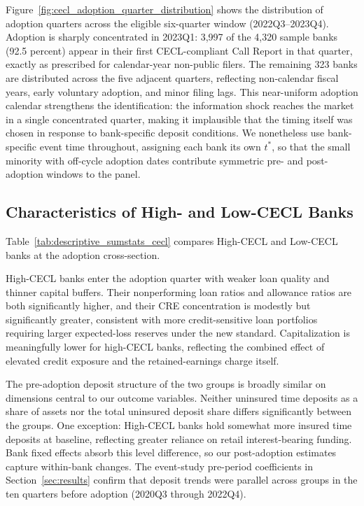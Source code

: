 Figure~\ref{fig:cecl_adoption_quarter_distribution} shows the distribution of
adoption quarters across the eligible six-quarter window (2022Q3--2023Q4).
Adoption is sharply concentrated in 2023Q1: 3,997 of the 4,320 sample banks
(92.5 percent) appear in their first CECL-compliant Call Report in that quarter,
exactly as prescribed for calendar-year non-public filers.  The remaining
323 banks are distributed across the five adjacent quarters, reflecting
non-calendar fiscal years, early voluntary adoption, and minor filing lags.
This near-uniform adoption calendar strengthens the identification: the
information shock reaches the market in a single concentrated quarter, making
it implausible that the timing itself was chosen in response to bank-specific
deposit conditions.  We nonetheless use bank-specific event time throughout,
assigning each bank its own $t^{*}$, so that the small minority with off-cycle
adoption dates contribute symmetric pre- and post-adoption windows to the panel.

\subsection{Characteristics of High- and Low-CECL Banks}
\label{sec:descriptive:balance}

Table~\ref{tab:descriptive_sumstats_cecl} compares High-CECL and Low-CECL banks
at the adoption cross-section.

High-CECL banks enter the adoption quarter with weaker loan quality and thinner
capital buffers.  Their nonperforming loan ratios and allowance ratios are both
significantly higher, and their CRE concentration is modestly but significantly
greater, consistent with more credit-sensitive loan portfolios requiring larger
expected-loss reserves under the new standard.  Capitalization is meaningfully
lower for high-CECL banks, reflecting the combined effect of elevated credit
exposure and the retained-earnings charge itself.

The pre-adoption deposit structure of the two groups is broadly similar on
dimensions central to our outcome variables.  Neither uninsured time deposits as
a share of assets nor the total uninsured deposit share differs significantly
between the groups.  One exception: High-CECL banks hold somewhat more insured
time deposits at baseline, reflecting greater reliance on retail interest-bearing
funding.  Bank fixed effects absorb this level difference, so our post-adoption
estimates capture within-bank changes.  The event-study pre-period coefficients
in Section~\ref{sec:results} confirm that deposit trends were parallel across
groups in the ten quarters before adoption (2020Q3 through 2022Q4).

